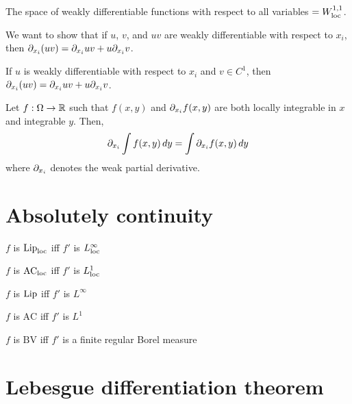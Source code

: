 \documentclass{../note}
\begin{document}
The space of weakly differentiable functions with respect to all variables $=W_{\mathrm{loc}}^{1,1}$.

\begin{prb}
We want to show that if $u$, $v$, and $uv$ are weakly differentiable with respect to $x_i$, then $\pd_{x_i}(uv)=\pd_{x_i}uv+u\pd_{x_i}v$.
\begin{parts}
\item If $u$ is weakly differentiable with respect to $x_i$ and $v\in C^1$, then $\pd_{x_i}(uv)=\pd_{x_i}uv+u\pd_{x_i}v$.
\end{parts}
\end{prb}


\begin{prb}
Let $f:\Omega\to\mathbb{R}$
such that $f(x,y)$ and $\pd_{x_i}f(x,y)$ are both locally integrable in $x$ and integrable $y$.
Then,
\[\pd_{x_i}\int f(x,y)\,dy=\int\pd_{x_i}f(x,y)\,dy\]
where $\pd_{x_i}$ denotes the weak partial derivative.
\end{prb}





\chapter{Absolutely continuity}

\begin{parts}
\item $f$ is $\operatorname{Lip}_{\mathrm{loc}}$ iff $f'$ is $L_{\mathrm{loc}}^\infty$
\item $f$ is $\textrm{AC}_{\mathrm{loc}}$ iff $f'$ is $L_{\mathrm{loc}}^1$
\end{parts}
\begin{parts}
\item $f$ is $\operatorname{Lip}$ iff $f'$ is $L^\infty$
\item $f$ is $\textrm{AC}$ iff $f'$ is $L^1$
\item $f$ is $\textrm{BV}$ iff $f'$ is a finite regular Borel measure
\end{parts}



\chapter{Lebesgue differentiation theorem}
\end{document}
